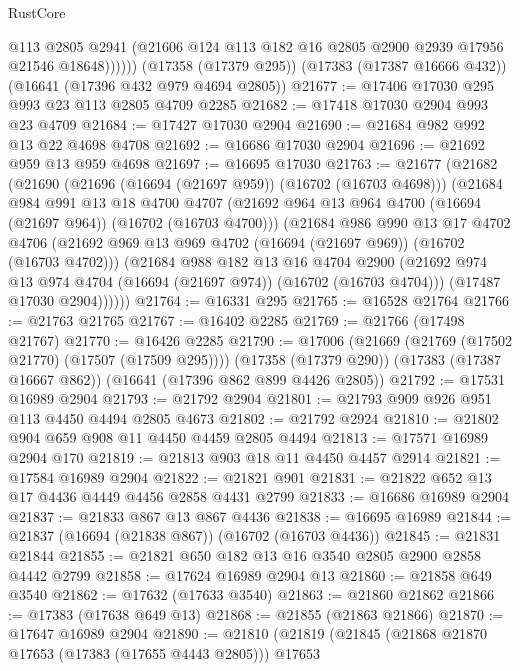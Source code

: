 \begin{lexlean}{RustCore}
\begin{coremodule}
              @113
              @2805
              @2941
              (@21606 @124 @113 @182 @16 @2805 @2900 @2939 @17956 @21546 @18648))))))
    (@17358 (@17379 @295))
    (@17383 (@17387 @16666 @432))
    (@16641 (@17396 @432 @979 @4694 @2805))
@21677 := @17406 @17030 @295 @993 @23 @113 @2805 @4709 @2285
@21682 := @17418 @17030 @2904 @993 @23 @4709
@21684 := @17427 @17030 @2904
@21690 := @21684 @982 @992 @13 @22 @4698 @4708
@21692 := @16686 @17030 @2904
@21696 := @21692 @959 @13 @959 @4698
@21697 := @16695 @17030
@21763 := @21677
    (@21682
      (@21690
        (@21696 (@16694 (@21697 @959)) (@16702 (@16703 @4698)))
        (@21684
          @984
          @991
          @13
          @18
          @4700
          @4707
          (@21692 @964 @13 @964 @4700 (@16694 (@21697 @964)) (@16702 (@16703 @4700)))
          (@21684
            @986
            @990
            @13
            @17
            @4702
            @4706
            (@21692 @969 @13 @969 @4702 (@16694 (@21697 @969)) (@16702 (@16703 @4702)))
            (@21684
              @988
              @182
              @13
              @16
              @4704
              @2900
              (@21692 @974 @13 @974 @4704 (@16694 (@21697 @974)) (@16702 (@16703 @4704)))
              (@17487 @17030 @2904))))))
@21764 := @16331 @295
@21765 := @16528 @21764
@21766 := @21763 @21765
@21767 := @16402 @2285
@21769 := @21766 (@17498 @21767)
@21770 := @16426 @2285
@21790 := @17006
    (@21669 (@21769 (@17502 @21770) (@17507 (@17509 @295))))
    (@17358 (@17379 @290))
    (@17383 (@17387 @16667 @862))
    (@16641 (@17396 @862 @899 @4426 @2805))
@21792 := @17531 @16989 @2904
@21793 := @21792 @2904
@21801 := @21793 @909 @926 @951 @113 @4450 @4494 @2805 @4673
@21802 := @21792 @2924
@21810 := @21802 @904 @659 @908 @11 @4450 @4459 @2805 @4494
@21813 := @17571 @16989 @2904 @170
@21819 := @21813 @903 @18 @11 @4450 @4457 @2914
@21821 := @17584 @16989 @2904
@21822 := @21821 @901
@21831 := @21822 @652 @13 @17 @4436 @4449 @4456 @2858 @4431 @2799
@21833 := @16686 @16989 @2904
@21837 := @21833 @867 @13 @867 @4436
@21838 := @16695 @16989
@21844 := @21837 (@16694 (@21838 @867)) (@16702 (@16703 @4436))
@21845 := @21831 @21844
@21855 := @21821 @650 @182 @13 @16 @3540 @2805 @2900 @2858 @4442 @2799
@21858 := @17624 @16989 @2904 @13
@21860 := @21858 @649 @3540
@21862 := @17632 (@17633 @3540)
@21863 := @21860 @21862
@21866 := @17383 (@17638 @649 @13)
@21868 := @21855 (@21863 @21866)
@21870 := @17647 @16989 @2904
@21890 := @21810
    (@21819
      (@21845
        (@21868 @21870 @17653 (@17383 (@17655 @4443 @2805)))
        @17653

\end{coremodule}
\end{lexlean}
